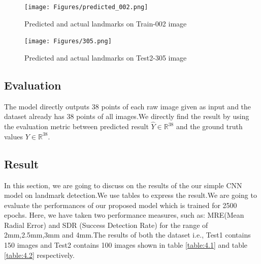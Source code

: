 \documentclass[sn-mathphys]{sn-jnl}%
\theoremstyle{thmstyleone}%
\theoremstyle{thmstyletwo}%
\theoremstyle{thmstylethree}%
\begin{document}



\begin{figure}[!tbp]
  \centering
  \begin{minipage}[b]{0.4\textwidth}
    \texttt{[image: Figures/predicted\_002.png]}
    \caption{Predicted and actual landmarks on Train-002 image}
     \label{figure 4.3:train002}
  \end{minipage}
  \hfill
  \begin{minipage}[b]{0.4\textwidth}
    \texttt{[image: Figures/305.png]}
    \caption{Predicted and actual landmarks on Test2-305 image}
    \label{figure 4.4:test305}
  \end{minipage}
\end{figure}


\subsection{Evaluation}
The model directly outputs 38 points of each raw image given as input and the dataset already has 38 points of all images.We directly find the result by using the evaluation metric between predicted result  \begin{math}  \hat{Y} \in \mathbb{R}^{38} \end{math} and the ground truth values \begin{math} Y \in \mathbb{R}^{38}\end{math}.
 
 
 \subsection{Result}
In this section, we are going to discuss on the results of the our simple CNN model on landmark detection.We use tables to
express the result.We are going to evaluate the performances of our proposed model which is trained for 2500 epochs. Here, we have taken two performance measures, such as: MRE(Mean Radial Error) and SDR (Success Detection Rate) for the range of 2mm,2.5mm,3mm and 4mm.The results of both the dataset i.e., Test1 contains 150 images and Test2 contains 100 images shown in table \ref{table:4.1} and table \ref{table:4.2} respectively.
 

 
 
\end{document}
